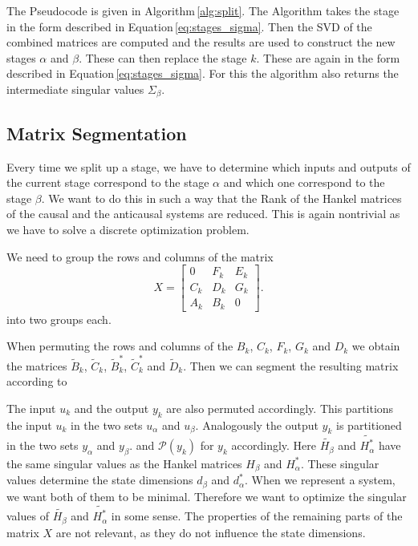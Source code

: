 \documentclass[numbers=noenddot,doctype=mastersthesis,BCOR=15mm,biblatex]{ldvbook}%
\newcommand{\partition}{\mathcal{P}}
\begin{document}
The Pseudocode is given in Algorithm\,\ref{alg:split}.
The Algorithm takes the stage in the form described in Equation\,\ref{eq:stages_sigma}.
Then the SVD of the combined matrices are computed and the results are used to construct the new stages $\alpha$ and $\beta$.
These can then replace the stage $k$.
These are again in the form described in Equation\,\ref{eq:stages_sigma}.
For this the algorithm also returns the intermediate singular values $\Sigma_\beta$.




\subsection{Matrix Segmentation}\label{subsec:segment_matrix}
Every time we split up a stage, we have to determine which inputs and outputs of the current stage correspond to the stage $\alpha$ and which one correspond to the stage $\beta$.
We want to do this in such a way that the Rank of the Hankel matrices of the causal and the anticausal systems are reduced.
This is again nontrivial as we have to solve a discrete optimization problem. 

We need to group the rows and columns of the matrix
\begin{equation}
X=
\begin{bmatrix}
0   &F_k & E_k\\
C_k & D_k & G_k\\
A_k & B_k & 0
\end{bmatrix}
.
\end{equation}
into two groups each.

When permuting the rows and columns of the $B_k$, $C_k$, $F_k$, $G_k$ and $D_k$ we obtain the matrices $\tilde{B}_k$, $\tilde{C}_k$, $\tilde{B}_k^*$, $\tilde{C}_k^*$ and $\tilde{D}_k$.
Then we can segment the resulting matrix according to 



The input $u_k$ and the output $y_k$ are also permuted accordingly.
This partitions the input $u_k$ in the two sets $u_\alpha$ and $u_\beta$.
Analogously the output $y_k$ is partitioned in the two sets $y_\alpha$ and $y_\beta$.
and $\partition(y_k)$ for $y_k$ accordingly.
Here $\tilde{H_\beta}$ and $\tilde{H_\alpha^*}$ have the same singular values as the Hankel matrices $H_\beta$ and $H_\alpha^*$.
These singular values determine the state dimensions $d_\beta$ and $d_\alpha^*$.
When we represent a system, we want both of them to be minimal.
Therefore we want to optimize the singular values of $\tilde{H_\beta}$ and $\tilde{H_\alpha^*}$ in some sense. 
The properties of the remaining parts of the matrix $X$ are not relevant, as they do not influence the state dimensions.
\end{document}
